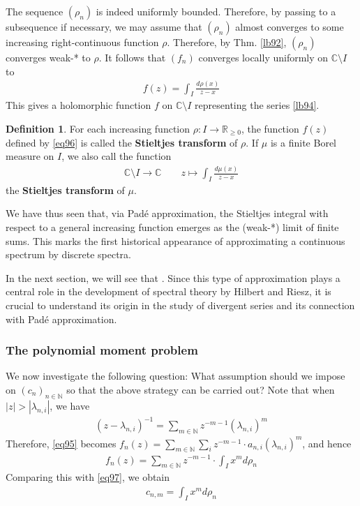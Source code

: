 \documentclass[12pt,b5paper,notitlepage]{article}
\theoremstyle{definition}
\newtheorem{df}{Definition}[subsection]
\theoremstyle{plain}
\newcommand{\Cbb}{\mathbb C}
\newcommand{\Nbb}{\mathbb N}
\newcommand{\Rbb}{\mathbb R}
\numberwithin{equation}{section}
\begin{document}
The sequence $(\rho_n)$ is indeed uniformly bounded. Therefore, by passing to a subsequence if necessary, we may assume that $(\rho_n)$ almost converges to some increasing right-continuous function $\rho$. Therefore, by Thm. \ref{lb92}, $(\rho_n)$ converges weak-* to $\rho$. It follows that $(f_n)$ converges locally uniformly on $\Cbb\setminus I$ to
\begin{align}\label{eq96}
f(z)=\int_I\frac{d\rho(x)}{z-x}
\end{align}
This gives a holomorphic function $f$ on $\Cbb\setminus I$ representing the series \ref{lb94}.

\begin{df}
For each increasing function $\rho:I\rightarrow\Rbb_{\geq0}$, the function $f(z)$ defined by \eqref{eq96} is called the \textbf{Stieltjes transform}  of $\rho$. If $\mu$ is a finite Borel measure on $I$, we also call the function
\begin{align*}
\Cbb\setminus I\rightarrow\Cbb\qquad z\mapsto\int_I\frac{d\mu(x)}{z-x}
\end{align*}
the \textbf{Stieltjes transform} of $\mu$.
\end{df}


We have thus seen that, via Pad\'e approximation, the Stieltjes integral with respect to a general increasing function emerges as the (weak-*) limit of finite sums. This marks the first historical appearance of approximating a continuous spectrum by discrete spectra.


In the next section, we will see that . Since this type of approximation plays a central role in the development of spectral theory by Hilbert and Riesz, it is crucial to understand its origin in the study of divergent series and its connection with Pad\'e approximation.


\subsubsection{The polynomial moment problem}\label{lb184}




We now investigate the following question: What assumption should we impose on $(c_n)_{n\in\Nbb}$ so that the above strategy can be carried out? Note that when $|z|>|\lambda_{n,i}|$, we have
\begin{align*}
(z-\lambda_{n,i})^{-1}=\sum_{m\in\Nbb} z^{-m-1}(\lambda_{n,i})^m
\end{align*}
Therefore, \eqref{eq95} becomes $f_n(z)=\sum_{m\in\Nbb}\sum_i z^{-m-1}\cdot a_{n,i}(\lambda_{n,i})^m$, and hence
\begin{align*}
f_n(z)=\sum_{m\in\Nbb}z^{-m-1}\cdot\int_I x^md\rho_n
\end{align*}
Comparing this with \eqref{eq97}, we obtain
\begin{align*}
c_{n,m}=\int_I x^m d\rho_n
\end{align*}
\end{document}
